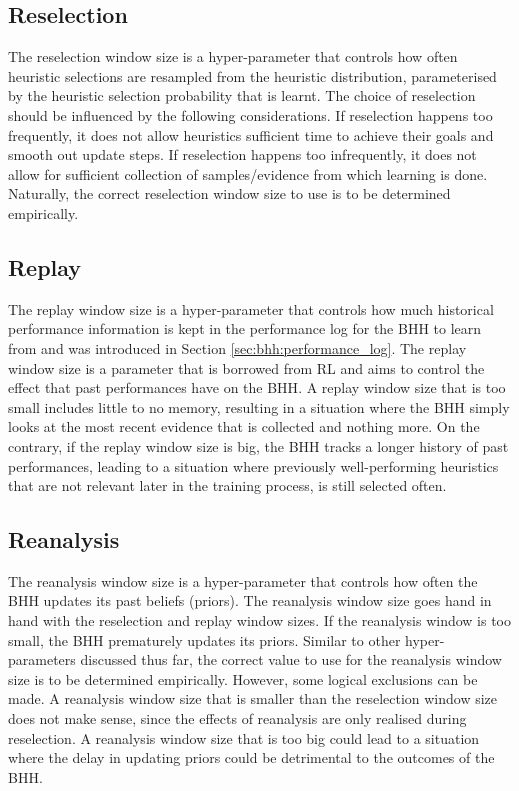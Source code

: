 \subsection{Reselection}\label{sec:bhh:hyper_parameters:reselection}

The reselection window size is a hyper-parameter that controls how often heuristic selections are resampled from the heuristic distribution, parameterised by the heuristic selection probability that is learnt. The choice of reselection should be influenced by the following considerations. If reselection happens too frequently, it does not allow heuristics sufficient time to achieve their goals and smooth out update steps. If reselection happens too infrequently, it does not allow for sufficient collection of samples/evidence from which learning is done. Naturally, the correct reselection window size to use is to be determined empirically.

\subsection{Replay}\label{sec:bhh:hyper_parameters:replay}

The replay window size is a hyper-parameter that controls how much historical performance information is kept in the performance log for the \acs{BHH} to learn from and was introduced in Section \ref{sec:bhh:performance_log}. The replay window size is a parameter that is borrowed from \acf{RL} and aims to control the effect that past performances have on the \acs{BHH}. A replay window size that is too small includes little to no memory, resulting in a situation where the \acs{BHH} simply looks at the most recent evidence that is collected and nothing more. On the contrary, if the replay window size is big, the \acs{BHH} tracks a longer history of past performances, leading to a situation where previously well-performing heuristics that are not relevant later in the training process, is still selected often.

\subsection{Reanalysis}\label{sec:bhh:hyper_parameters:reanalysis}

The reanalysis window size is a hyper-parameter that controls how often the \acs{BHH} updates its past beliefs (priors). The reanalysis window size goes hand in hand with the reselection and replay window sizes. If the reanalysis window is too small, the \acs{BHH} prematurely updates its priors. Similar to other hyper-parameters discussed thus far, the correct value to use for the reanalysis window size is to be determined empirically. However, some logical exclusions can be made. A reanalysis window size that is smaller than the reselection window size does not make sense, since the effects of reanalysis are only realised during reselection. A reanalysis window size that is too big could lead to a situation where the delay in updating priors could be detrimental to the outcomes of the \acs{BHH}.


